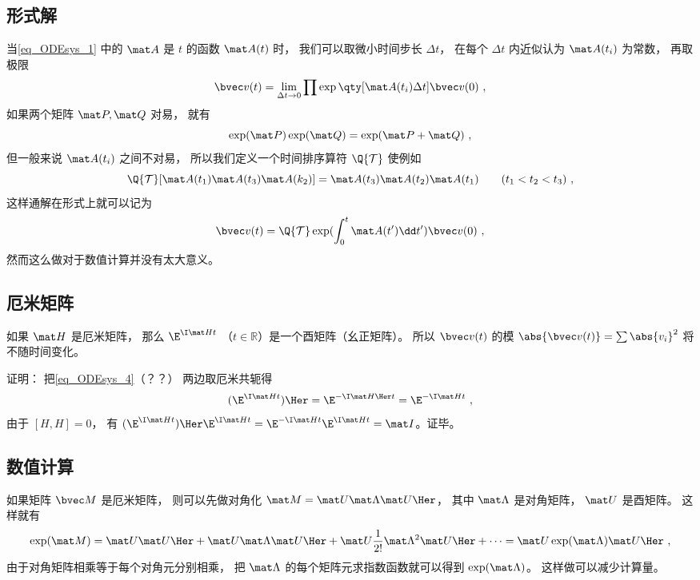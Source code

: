 \subsection{形式解}
当\autoref{eq_ODEsys_1} 中的 $\mat A$ 是 $t$ 的函数 $\mat A(t)$ 时， 我们可以取微小时间步长 $\Delta t$， 在每个 $\Delta t$ 内近似认为 $\mat A(t_i)$ 为常数， 再取极限
\begin{equation}
\bvec v(t) = \lim_{\Delta t \to 0} \prod \exp\qty[\mat A(t_i)\Delta t] \bvec v(0)~,
\end{equation}
如果两个矩阵 $\mat P, \mat Q$ 对易， 就有
\begin{equation}
\exp(\mat P)\exp(\mat Q) = \exp(\mat P + \mat Q)~,
\end{equation}
但一般来说 $\mat A(t_i)$ 之间不对易， 所以我们定义一个时间排序算符 $\Q{\mathcal T}$ 使例如
\begin{equation}
\Q {\mathcal T} [\mat A(t_1) \mat A(t_3) \mat A(k_2)] = \mat A(t_3) \mat A(t_2) \mat A(t_1) \qquad ( t_1 < t_2 < t_3 )~,
\end{equation}
这样通解在形式上就可以记为
\begin{equation}\label{eq_ODEsys_3}
\bvec v(t) = \Q {\mathcal T} \exp(\int_0^ t \mat A(t')\dd t') \bvec v(0)~,
\end{equation}
然而这么做对于数值计算并没有太大意义。

\subsection{厄米矩阵}
如果 $\mat H$ 是厄米矩阵， 那么 $\E^{\I \mat H t}$ （$t\in \mathbb R$）是一个酉矩阵（幺正矩阵）。 所以 $\bvec v(t)$ 的模 $\abs{\bvec v(t)} = \sum \abs{v_i}^2$ 将不随时间变化。

证明： 把\autoref{eq_ODEsys_4}（？？） 两边取厄米共轭得
\begin{equation}
(\E^{\I \mat H t})\Her = \E^{-\I \mat H\Her t} = \E^{-\I \mat H t}~,
\end{equation}
由于 $[H,H] = 0$， 有 $(\E^{\I \mat H t})\Her \E^{\I \mat H t} = \E^{-\I \mat H t}\E^{\I \mat H t} = \mat I$。证毕。

\subsection{数值计算}
如果矩阵 $\bvec M$ 是厄米矩阵， 则可以先做对角化 $\mat M = \mat U \mat \Lambda \mat U\Her$， 其中 $\mat \Lambda$ 是对角矩阵， $\mat U$ 是酉矩阵。 这样就有
\begin{equation}
\exp(\mat M) = \mat U \mat U\Her + \mat U\mat \Lambda\mat U\Her + \mat U\frac1{2!} \mat \Lambda^2 \mat U\Her + \dots = \mat U \exp(\mat \Lambda) \mat U\Her~,
\end{equation}
由于对角矩阵相乘等于每个对角元分别相乘， 把 $\mat\Lambda$ 的每个矩阵元求指数函数就可以得到 $\exp(\mat \Lambda)$。 这样做可以减少计算量。

